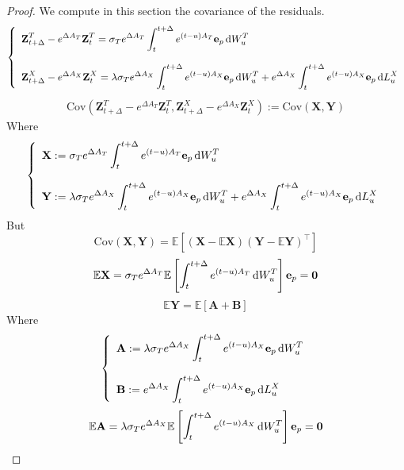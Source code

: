 \documentclass[10pt,a4paper,reqno]{amsart}
\theoremstyle{example}
\newcommand{\Cov}{\mathrm{Cov}}
\newcommand*\D{\mathop{}\!\textnormal{d}}
\begin{document}
\begin{proof}
 We compute in this section the covariance of the residuals.
$$
\left\{
\begin{array}{l}
\displaystyle\textbf{Z}_{t+\Delta}^T - e^{\Delta A_T}\textbf{Z}_t^T=\sigma_Te^{\Delta A_T}\int_t^{t+\Delta}e^{(t-u)A_T}\textbf{e}_p\D W_u^T   \\
\\
\displaystyle\textbf{Z}_{t+\Delta}^X - e^{\Delta A_X}\textbf{Z}_t^X=\lambda\sigma_Te^{\Delta A_X}\int_t^{t+\Delta}e^{(t-u)A_X}\textbf{e}_p\D W_u^T+
e^{\Delta A_X}\int_t^{t+\Delta}e^{(t-u)A_X}\textbf{e}_p\D L_u^X \\
\end{array}
\right.
$$
\begin{align}
    \Cov\left(\textbf{Z}_{t+\Delta}^T - e^{\Delta A_T}\textbf{Z}_t^T,\textbf{Z}_{t+\Delta}^X - e^{\Delta A_X}\textbf{Z}_t^X\right):=\Cov\left(\textbf{X},\textbf{Y}\right)\nonumber
\end{align}
Where
\newline
$$
\left\{
\begin{array}{l}
\displaystyle\textbf{X}:=\sigma_Te^{\Delta A_T}\int_t^{t+\Delta}e^{(t-u)A_T}\textbf{e}_p\D W_u^T\\
\\
\displaystyle\textbf{Y}:=\lambda\sigma_Te^{\Delta A_X}\int_t^{t+\Delta}e^{(t-u)A_X}\textbf{e}_p\D W_u^T+e^{\Delta A_X}\int_t^{t+\Delta}e^{(t-u)A_X}\textbf{e}_p\D L_u^X
\end{array}
\right.
$$
\newline
But
\newline
$$
\Cov\left(\textbf{X},\textbf{Y}\right) = \mathbb{E}[(\textbf{X}-\mathbb{E}\textbf{X})(\textbf{Y}-\mathbb{E}\textbf{Y})^\intercal]
$$
$$
\mathbb{E}\textbf{X}=\sigma_Te^{\Delta A_T}\mathbb{E}\left[\int_t^{t+\Delta}e^{(t-u)A_T}\D W_u^T \right]\textbf{e}_p = \textbf{0}
$$
\newline
$$
\mathbb{E}\textbf{Y}=\mathbb{E}[\textbf{A}+\mathbf{B}]
$$
Where
\newline
$$
\left\{
\begin{array}{l}
\displaystyle\textbf{A}:=\lambda\sigma_Te^{\Delta A_X}\int_t^{t+\Delta}e^{(t-u)A_X}\textbf{e}_p\D W_u^T\\
\\
\displaystyle\mathbf{B}:=e^{\Delta A_X}\int_t^{t+\Delta}e^{(t-u)A_X}\textbf{e}_p\D L_u^X
\end{array}
\right.
$$
\newline
$$
\mathbb{E}\textbf{A}=\lambda\sigma_Te^{\Delta A_X}\mathbb{E}\left[\int_t^{t+\Delta}e^{(t-u)A_X}\D W_u^T \right]\textbf{e}_p = \textbf{0}
$$
\end{proof}
\end{document}
